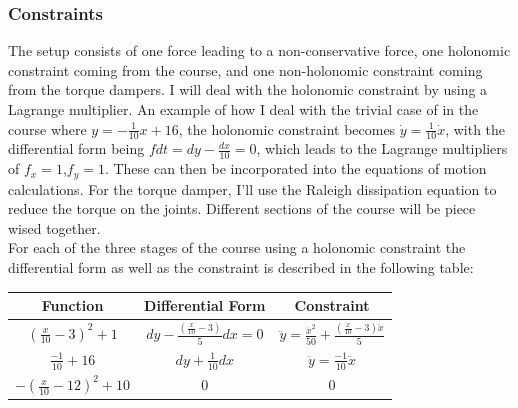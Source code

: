 \documentclass{article}
\begin{document}
\subsubsection{Constraints}
The setup consists of one force leading to a non-conservative force, one holonomic constraint coming from the course, and one non-holonomic constraint coming from the torque dampers. I will deal with the holonomic constraint by using a Lagrange multiplier.  An example of how I deal with the trivial case of in the course where $y=-\frac{1}{10}x+16$, the holonomic constraint becomes $\dot{y}=\frac{1}{10}\dot{x}$, with the differential form being $fdt=dy-\frac{dx}{10}=0$, which leads to the Lagrange multipliers of $f_x=1$,$f_y=1$. These can then be incorporated into the equations of motion calculations.  For the torque damper, I’ll use the Raleigh dissipation equation to reduce the torque on the joints. Different sections of the course will be piece wised together. \\
For each of the three stages of the course using a holonomic constraint the differential form as well as the constraint is described in the following table:
\begin{center}
\begin{tabular}{c|c|c}
	Function&Differential Form&Constraint\\
	\hline
	$(\frac{x}{10}-3)^2+1$&$dy-\frac{\left(\frac{x}{10} - 3\right)}{5} dx=0$&$\ddot{y}=\frac{\dot{x}^2}{50} + \frac{\left(\frac{x}{10} - 3\right) \ddot{x}}{5}$\\
	$\frac{-1}{10}+16$&$dy+\frac{1}{10}dx$&$\ddot{y}=\frac{-1}{10}\ddot{x}$\\
	$-(\frac{x}{10}-12)^2+10$&0&0\\
\end{tabular}
\end{center}
\end{document}
